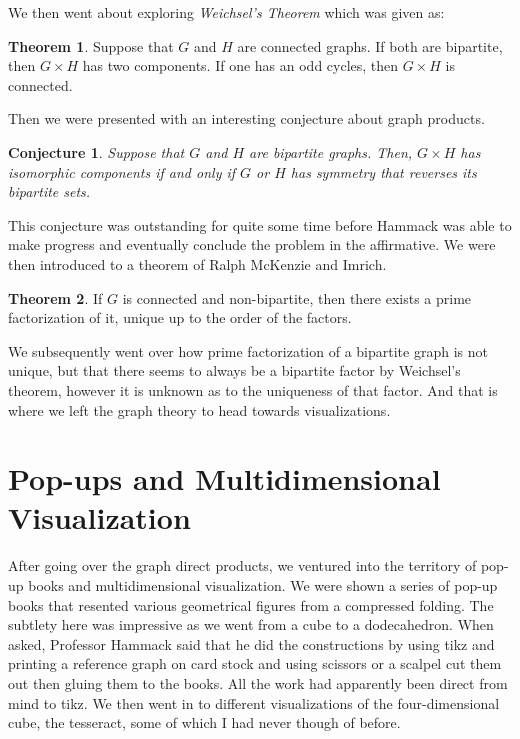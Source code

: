 \documentclass[12pt]{amsart}
\theoremstyle{conjecture}
\newtheorem{conjecture}{Conjecture}
\theoremstyle{definition}
\theoremstyle{question}
\theoremstyle{theorem}
\newtheorem{theorem}{Theorem}
\begin{document}
\begin{onehalfspace}
        We then went about exploring \emph{Weichsel's Theorem} which was given as:
        \begin{theorem}
            Suppose that $G$ and $H$ are connected graphs.
            If both are bipartite, then $G\times H$ has two components.
            If one has an odd cycles, then $G\times H$ is connected.
        \end{theorem}
        Then we were presented with an interesting conjecture about graph products.
        \begin{conjecture}
            Suppose that $G$ and $H$ are bipartite graphs.
            Then, $G\times H$ has isomorphic components if and only if $G$ or $H$ has symmetry that reverses
            its bipartite sets.
        \end{conjecture}
        This conjecture was outstanding for quite some time before Hammack was able to make progress and
        eventually conclude the problem in the affirmative.
        We were then introduced to a theorem of Ralph McKenzie and Imrich.
        \begin{theorem}
            If $G$ is connected and non-bipartite, then there exists a prime factorization of it, unique up to the
            order of the factors.
        \end{theorem}
        We subsequently went over how prime factorization of a bipartite graph is not unique, but that there seems to
        always be a bipartite factor by Weichsel's theorem, however it is unknown as to the uniqueness of that factor.
        And that is where we left the graph theory to head towards visualizations.

        \section{Pop-ups and Multidimensional Visualization}
        After going over the graph direct products, we ventured into the territory of pop-up books and multidimensional
        visualization.
        We were shown a series of pop-up books that resented various geometrical figures from a compressed folding.
        The subtlety here was impressive as we went from a cube to a dodecahedron.
        When asked, Professor Hammack said that he did the constructions by using tikz and printing a reference graph on
        card stock and using scissors or a scalpel cut them out then gluing them to the books.
        All the work had apparently been direct from mind to tikz.
        We then went in to different visualizations of the four-dimensional cube, the tesseract, some of which I had
        never though of before.


\end{onehalfspace}
\end{document}
